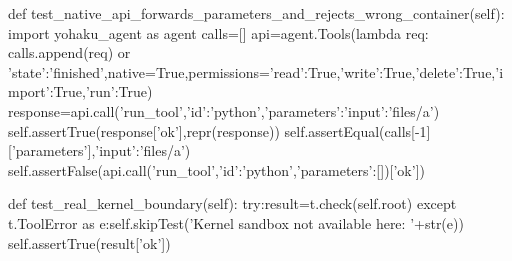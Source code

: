     def test_native_api_forwards_parameters_and_rejects_wrong_container(self):
        import yohaku_agent as agent
        calls=[]
        api=agent.Tools(lambda req: calls.append(req) or {'state':'finished'},native=True,permissions={'read':True,'write':True,'delete':True,'import':True,'run':True})
        response=api.call('run_tool',{'id':'python','parameters':{'input':'files/a'}})
        self.assertTrue(response['ok'],repr(response))
        self.assertEqual(calls[-1]['parameters'],{'input':'files/a'})
        self.assertFalse(api.call('run_tool',{'id':'python','parameters':[]})['ok'])

    def test_real_kernel_boundary(self):
        try:result=t.check(self.root)
        except t.ToolError as e:self.skipTest('Kernel sandbox not available here: '+str(e))
        self.assertTrue(result['ok'])

